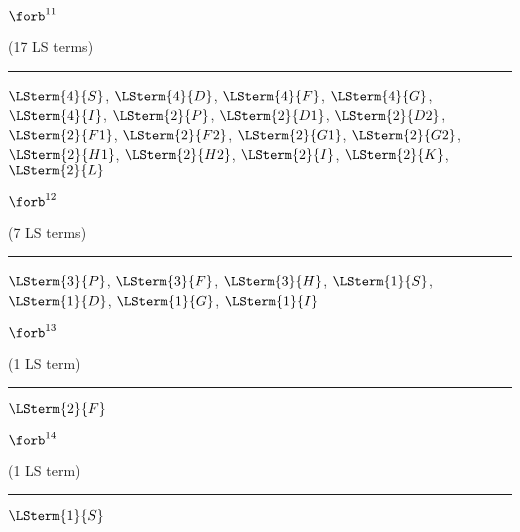 \begin{mdframed}\begin{center}
$\forb^{11}$

(17 LS terms)
\vspace{0.25cm}\hrule\vspace{0.25cm}

$\LSterm{4}{S}$, $\LSterm{4}{D}$, $\LSterm{4}{F}$, $\LSterm{4}{G}$, $\LSterm{4}{I}$, $\LSterm{2}{P}$, $\LSterm{2}{D1}$, $\LSterm{2}{D2}$, $\LSterm{2}{F1}$, $\LSterm{2}{F2}$, $\LSterm{2}{G1}$, $\LSterm{2}{G2}$, $\LSterm{2}{H1}$, $\LSterm{2}{H2}$, $\LSterm{2}{I}$, $\LSterm{2}{K}$, $\LSterm{2}{L}$
\end{center}\end{mdframed}

\begin{mdframed}\begin{center}
$\forb^{12}$

(7 LS terms)
\vspace{0.25cm}\hrule\vspace{0.25cm}

$\LSterm{3}{P}$, $\LSterm{3}{F}$, $\LSterm{3}{H}$, $\LSterm{1}{S}$, $\LSterm{1}{D}$, $\LSterm{1}{G}$, $\LSterm{1}{I}$
\end{center}\end{mdframed}

\begin{mdframed}\begin{center}
$\forb^{13}$

(1 LS term)
\vspace{0.25cm}\hrule\vspace{0.25cm}

$\LSterm{2}{F}$
\end{center}\end{mdframed}

\begin{mdframed}\begin{center}
$\forb^{14}$

(1 LS term)
\vspace{0.25cm}\hrule\vspace{0.25cm}

$\LSterm{1}{S}$
\end{center}\end{mdframed}

